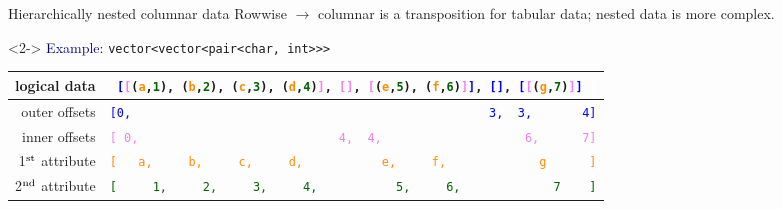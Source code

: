\documentclass[aspectratio=169]{beamer}
\begin{document}
\begin{frame}{Hierarchically nested columnar data}
\vspace{0.25 cm}
Rowwise $\to$ columnar is a transposition for tabular data; nested data is more complex.

\begin{uncoverenv}<2->
\vspace{0.25 cm}
\textcolor{darkblue}{Example:} {\tt\small vector<vector<pair<char, int>>>}

\vspace{0.25 cm}
\begin{tabular}{r l}
\small logical data & {\tt\scriptsize \textcolor{white}{[}\textcolor{blue}{[}\textcolor{violet}{[}(\textcolor{darkorange}{a},\textcolor{darkgreen}{1}), (\textcolor{darkorange}{b},\textcolor{darkgreen}{2}), (\textcolor{darkorange}{c},\textcolor{darkgreen}{3}), (\textcolor{darkorange}{d},\textcolor{darkgreen}{4})\textcolor{violet}{]}, \textcolor{violet}{[]}, \textcolor{violet}{[}(\textcolor{darkorange}{e},\textcolor{darkgreen}{5}), (\textcolor{darkorange}{f},\textcolor{darkgreen}{6})\textcolor{violet}{]}\textcolor{blue}{]}, \textcolor{blue}{[]}, \textcolor{blue}{[}\textcolor{violet}{[}(\textcolor{darkorange}{g},\textcolor{darkgreen}{7})\textcolor{violet}{]}\textcolor{blue}{]}\ \textcolor{white}{]}} \\\hline
\small outer offsets & {\tt\scriptsize \textcolor{blue}{[0,\ \ \ \ \ \ \ \ \ \ \ \ \ \ \ \ \ \ \ \ \ \ \ \ \ \ \ \ \ \ \ \ \ \ \ \ \ \ \ \ \ \ \ \ \ \ \ \ \ \ 3,\ \ 3,\ \ \ \ \ \ \ 4]}} \\
\small inner offsets & {\tt\scriptsize \textcolor{violet}{[\ 0,\ \ \ \ \ \ \ \ \ \ \ \ \ \ \ \ \ \ \ \ \ \ \ \ \ \ \ \ 4,\ \ 4,\ \ \ \ \ \ \ \ \ \ \ \ \ \ \ \ \ \ \ \ 6,\ \ \ \ \ \ 7]}} \\
\small 1$^{\mbox{\scriptsize st}}$ attribute & {\tt\scriptsize \textcolor{darkorange}{[\ \ \ a,\ \ \ \ \ b,\ \ \ \ \ c,\ \ \ \ \ d,\ \ \ \ \ \ \ \ \ \ \ e,\ \ \ \ \ f,\ \ \ \ \ \ \ \ \ \ \ \ \ g\ \ \ \ \ \ ]}} \\
\small 2$^{\mbox{\scriptsize nd}}$ attribute & {\tt\scriptsize \textcolor{darkgreen}{[\ \ \ \ \ 1,\ \ \ \ \ 2,\ \ \ \ \ 3,\ \ \ \ \ 4,\ \ \ \ \ \ \ \ \ \ \ 5,\ \ \ \ \ 6,\ \ \ \ \ \ \ \ \ \ \ \ \ 7\ \ \ \ ]}}
\end{tabular}
\end{uncoverenv}


\end{frame}
\end{document}
